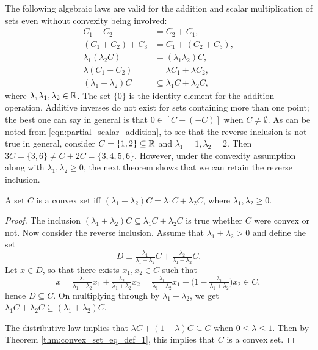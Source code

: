\documentclass[11pt,a4paper]{article}
\begin{document}
\begin{remark}
    The following algebraic laws are valid for the addition and scalar multiplication of sets even without convexity being involved:
    \begin{align}
        C_1+ C_2 &= C_2+C_1,\nonumber\\
        (C_1+C_2)+C_3 &= C_1+(C_2+C_3),\nonumber\\
        \lambda_1(\lambda_2 C) &= (\lambda_1\lambda_2) C,\nonumber\\
        \lambda(C_1+C_2) &= \lambda C_1 +\lambda C_2,\nonumber\\
        (\lambda_1 +\lambda_2)C &\subseteq \lambda_1 C + \lambda_2 C,\label{eqn:partial_scalar_addition}
    \end{align}
    where $\lambda,\lambda_1,\lambda_2\in \mathbb{R}$. The set $\{0\}$ is the identity element for the addition operation. Additive inverses do not exist for sets containing more than one point; the best one can say in general is that $0\in [C+(-C)]$ when $C\neq \emptyset$. As can be noted from \eqref{eqn:partial_scalar_addition}, to see that the reverse inclusion is not true in general, consider $C = \{1,2\}\subseteq \mathbb{R}$ and $\lambda_1 = 1,\lambda_2 = 2$. Then $3C = \{3,6\}\neq C + 2C = \{3,4,5,6\}$. However, under the convexity assumption along with $\lambda_1,\lambda_2\ge 0$, the next theorem shows that we can retain the reverse inclusion.
\end{remark}

\begin{theorem}
    A set $C$ is a convex set iff $(\lambda_1+\lambda_2)C = \lambda_1 C + \lambda_2 C$, where $\lambda_1,\lambda_2\ge 0$.
\end{theorem}

\begin{proof}
    \forward The inclusion $(\lambda_1 +\lambda_2)C \subseteq \lambda_1 C + \lambda_2 C$ is true whether $C$ were convex or not. Now consider the reverse inclusion. Assume that $\lambda_1+\lambda_2>0$ and define the set 
    \begin{equation*}
        D\equiv \tfrac{\lambda_1}{\lambda_1+\lambda_2} C + \tfrac{\lambda_2}{\lambda_1+\lambda_2}C.
    \end{equation*}
    Let $x\in D$, so that there exists $x_1,x_2\in C$ such that 
    \begin{equation*}
        x = \tfrac{\lambda_1}{\lambda_1+\lambda_2}x_1 + \tfrac{\lambda_2}{\lambda_1+\lambda_2}x_2 = \tfrac{\lambda_1}{\lambda_1+\lambda_2}x_1 + \Big(1-\tfrac{\lambda_1}{\lambda_1+\lambda_2}\Big)x_2 \in C,
    \end{equation*}
    hence $D \subseteq C$. On multiplying through by $\lambda_1+\lambda_2$, we get $\lambda_1 C +\lambda_2 C \subseteq (\lambda_1+\lambda_2)C$.

    \noindent\converse The distributive law implies that $\lambda C + (1-\lambda) C \subseteq C$ when $0\le \lambda\le 1$. Then by Theorem \ref{thm:convex_set_eq_def_1}, this implies that $C$ is a convex set. 
\end{proof}
\end{document}
